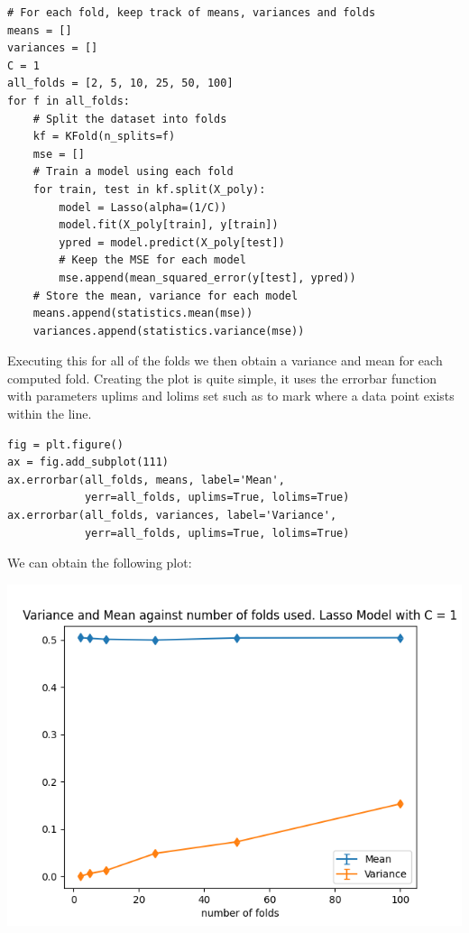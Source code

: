 \documentclass[10pt]{article}
\begin{document}
\begin{lstlisting}
# For each fold, keep track of means, variances and folds
means = []
variances = []
C = 1
all_folds = [2, 5, 10, 25, 50, 100]
for f in all_folds:
    # Split the dataset into folds
    kf = KFold(n_splits=f)
    mse = []
    # Train a model using each fold
    for train, test in kf.split(X_poly):
        model = Lasso(alpha=(1/C))
        model.fit(X_poly[train], y[train])
        ypred = model.predict(X_poly[test])
        # Keep the MSE for each model
        mse.append(mean_squared_error(y[test], ypred))
    # Store the mean, variance for each model
    means.append(statistics.mean(mse))
    variances.append(statistics.variance(mse))
\end{lstlisting}


Executing this for all of the folds we then obtain a variance and mean for each computed fold.
Creating the plot is quite simple, it uses the errorbar function
with parameters uplims and lolims set such as to mark where a
data point exists within the line.

\begin{lstlisting}
fig = plt.figure()
ax = fig.add_subplot(111)
ax.errorbar(all_folds, means, label='Mean',
            yerr=all_folds, uplims=True, lolims=True)
ax.errorbar(all_folds, variances, label='Variance',
            yerr=all_folds, uplims=True, lolims=True)
\end{lstlisting}

We can obtain the following plot:

\begin{center}
    \includegraphics[scale=0.4]{Figure_9.png}
\end{center}
\end{document}
